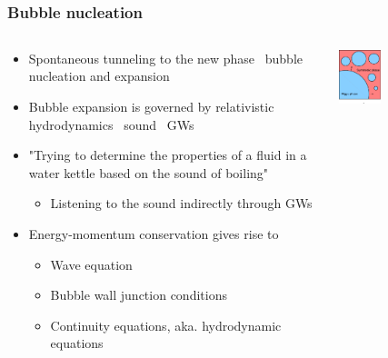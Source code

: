 \begin{frame}
\begin{columns}
\begin{column}{0.5\textwidth}
        \\
    \end{column}
    \end{columns}
\end{frame}

\begin{frame}
    \frametitle{Bubble nucleation}
    \begin{columns}
    \begin{column}{0.6\textwidth}
        \begin{itemize}
            \item Spontaneous tunneling to the new phase \textrightarrow \ bubble nucleation and expansion
            \item Bubble expansion is governed by relativistic hydrodynamics \textrightarrow \ sound \textrightarrow \ GWs
            \item "Trying to determine the properties of a fluid in a water kettle based on the sound of boiling"
            \begin{itemize}
                \item Listening to the sound indirectly through GWs
            \end{itemize}
            \item Energy-momentum conservation gives rise to
            \begin{itemize}
                \item Wave equation
                \item Bubble wall junction conditions
                \item Continuity equations, aka. hydrodynamic equations
            \end{itemize}
        \end{itemize}
    \end{column}
    \begin{column}{0.4\textwidth}
        \includegraphics[width=0.33\textwidth]{../fig/lecture_notes/HiggsBubble1}%

\end{column}
\end{columns}
\end{frame}

